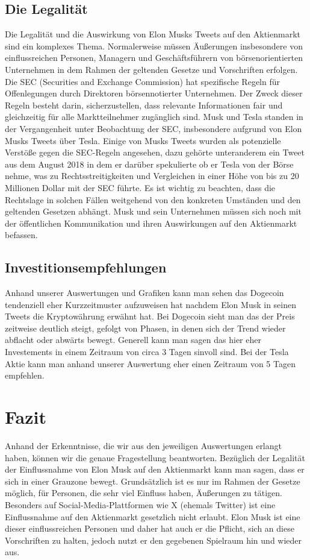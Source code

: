 \documentclass{article}
\begin{document}
\subsection{Die Legalität}
Die Legalität und die Auswirkung von Elon Musks Tweets auf den Aktienmarkt sind ein komplexes Thema. Normalerweise müssen Äußerungen insbesondere von einflussreichen Personen, Managern und Geschäftsführern von börsenorientierten Unternehmen in dem Rahmen der geltenden Gesetze und Vorschriften erfolgen.
Die SEC (Securities and Exchange Commission) hat spezifische Regeln für Offenlegungen durch
Direktoren börsennotierter Unternehmen. Der Zweck dieser Regeln besteht darin, sicherzustellen,
dass relevante Informationen fair und gleichzeitig für alle Marktteilnehmer zugänglich sind. Musk und Tesla standen in der Vergangenheit unter Beobachtung der SEC, insbesondere aufgrund von Elon Musks Tweets über Tesla. Einige von Musks Tweets wurden als potenzielle Verstöße gegen die SEC-Regeln angesehen, dazu gehörte unteranderem ein Tweet aus dem August 2018 in dem er darüber spekulierte ob er Tesla von der Börse nehme, was zu Rechtsstreitigkeiten und Vergleichen in einer Höhe von bis zu 20 Millionen Dollar mit der SEC führte. Es ist wichtig zu beachten, dass die Rechtslage in solchen Fällen weitgehend von den konkreten Umständen und den
geltenden Gesetzen abhängt. Musk und sein Unternehmen müssen sich noch mit der öffentlichen
Kommunikation und ihren Auswirkungen auf den Aktienmarkt befassen.

\subsection{Investitionsempfehlungen}
Anhand unserer Auswertungen und Grafiken kann man sehen das Dogecoin tendenziell eher Kurzzeitmuster aufzuweisen hat nachdem Elon Musk in seinen Tweets die Kryptowährung erwähnt hat. Bei Dogecoin sieht man das der Preis zeitweise deutlich steigt, gefolgt von Phasen, in denen sich der Trend wieder abflacht oder abwärts bewegt. Generell kann man sagen das hier eher Investements in einem Zeitraum von circa 3 Tagen sinvoll sind. Bei der Tesla Aktie kann man anhand unserer Auswertung eher einen Zeitraum von 5 Tagen empfehlen.


\section{Fazit}
Anhand der Erkenntnisse, die wir aus den jeweiligen Auswertungen erlangt haben, können wir die genaue Fragestellung beantworten. Bezüglich der Legalität der Einflussnahme von Elon Musk auf den Aktienmarkt kann man sagen, dass er sich in einer Grauzone bewegt. Grundsätzlich ist es nur im Rahmen der Gesetze möglich, für Personen, die sehr viel Einfluss haben, Äußerungen zu tätigen. Besonders auf Social-Media-Plattformen wie X (ehemals Twitter) ist eine Einflussnahme auf den Aktienmarkt gesetzlich nicht erlaubt. Elon Musk ist eine dieser einflussreichen Personen und daher hat auch er die Pflicht, sich an diese Vorschriften zu halten, jedoch nutzt er den gegebenen Spielraum hin und wieder aus.
\end{document}
